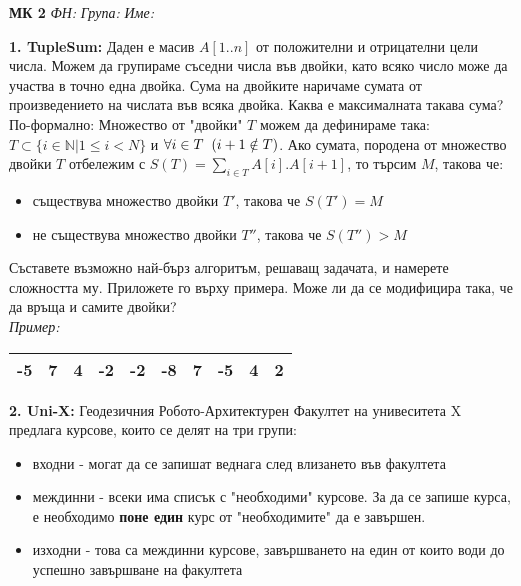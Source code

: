 \documentclass[fleqn,12pt]{article}
\begin{document}
\begin{flushleft}
\textbf{МК 2} \hspace{5mm}\textit{ФН:} \hspace{5mm} \hspace{20mm} \textit{Група: } \hspace{10mm} \textit{Име: } \\
\vspace{5mm}

\textbf{1. TupleSum:} Даден е масив $A[1..n]$ от положителни и отрицателни цели числа. Можем да групираме съседни числа във двойки, като всяко число може да участва в точно една двойка. Сума на двойките наричаме сумата от произведението на числата във всяка двойка. Каква е максималната такава сума? \\

По-формално: Множество от "двойки" \hspace{1mm} $T$ можем да дефинираме така: $T \subset \{ i \in \mathbb{N} | 1 \leq i < N \}$ и $\forall i \in T \hspace{2mm} (i + 1 \notin T)$. Ако сумата, породена от множество двойки $T$ отбележим с $S(T) = \sum_{i \in T} A[i] . A[i+1]$, то търсим $M$, такова че:

\begin{itemize}
	\item съществува множество двойки $T'$, такова че $S(T')=M$
	\item не съществува множество двойки $T''$, такова че $S(T'') > M$
\end{itemize}

Съставете възможно най-бърз алгоритъм, решаващ задачата, и намерете сложността му. Приложете го върху примера. Може ли да се модифицира така, че да връща и самите двойки? \\
\vspace{5mm}
\textit{Пример: } \begin{tabular}{|c|c|c|c|c|c|c|c|c|c|} \hline -5 & 7 & 4 & -2 & -2 & -8 & 7 & -5 & 4 & 2 \\ \hline \end{tabular}

\vspace{10mm}
\textbf{2. Uni-X: } Геодезичния Робото-Архитектурен Факултет на унивеситета X предлага курсове, които се делят на три групи:

\begin{itemize}
	\item входни - могат да се запишат веднага след влизането във факултета
	\item междинни - всеки има списък с "необходими" курсове. За да се запише курса, е необходимо \textbf{поне един} курс от "необходимите" да е завършен.
	\item изходни - това са междинни курсове, завършването на един от които води до успешно завършване на факултета
\end{itemize}


\end{flushleft}
\end{document}
